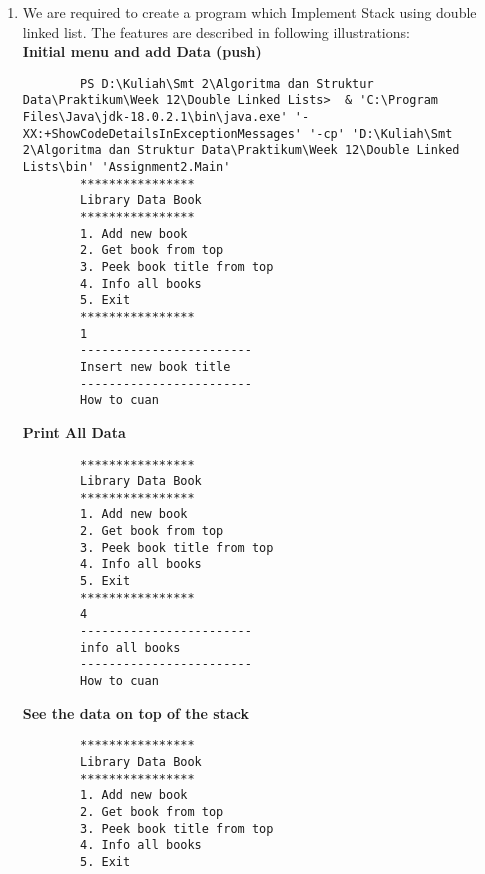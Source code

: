 \documentclass[12pt,titlepage]{article}
\begin{document}
\begin{enumerate}
\begin{verbatim}
        successfully added
        =========================================
        Data manipulation with Double Linked List
        =========================================
        1. Add First
        2. Add Tail
        3. Add Data in the nth index
        4. Remove First
        5. Remove Tail
        6. Remove Data in the nth index
        7. Print
        8. Search Data
        9. Sort Data
        10. Exit
        =========================================
        10
        PS D:\Kuliah\Smt 2\Algoritma dan Struktur Data\Praktikum\Week 12\Double Linked Lists>
    \end{verbatim}
    \item We are required to create a program which Implement Stack using double linked list. The features are described in following illustrations:
    \hbox{}\\\textbf{Initial menu and add Data (push)}
    \begin{verbatim}
        PS D:\Kuliah\Smt 2\Algoritma dan Struktur Data\Praktikum\Week 12\Double Linked Lists>  & 'C:\Program Files\Java\jdk-18.0.2.1\bin\java.exe' '-XX:+ShowCodeDetailsInExceptionMessages' '-cp' 'D:\Kuliah\Smt 2\Algoritma dan Struktur Data\Praktikum\Week 12\Double Linked Lists\bin' 'Assignment2.Main'
        ****************
        Library Data Book
        ****************
        1. Add new book
        2. Get book from top
        3. Peek book title from top
        4. Info all books
        5. Exit
        ****************
        1
        ------------------------
        Insert new book title
        ------------------------
        How to cuan
    \end{verbatim}
    \textbf{Print All Data}
    \begin{verbatim}
        ****************
        Library Data Book
        ****************
        1. Add new book
        2. Get book from top
        3. Peek book title from top
        4. Info all books
        5. Exit
        ****************
        4
        ------------------------
        info all books
        ------------------------
        How to cuan
    \end{verbatim}
    \textbf{See the data on top of the stack}
    \begin{verbatim}
        ****************
        Library Data Book
        ****************
        1. Add new book
        2. Get book from top
        3. Peek book title from top
        4. Info all books
        5. Exit

\end{verbatim}
\end{enumerate}
\end{document}
